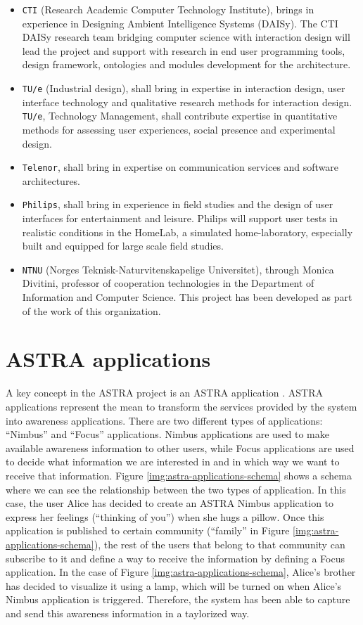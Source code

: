 \begin{itemize}
  \item \verb|CTI| (Research Academic Computer Technology Institute), brings in
  experience in Designing Ambient Intelligence Systems (DAISy). 
  The CTI DAISy research team bridging computer science with interaction design will 
  lead the project and support with research in end user programming tools, design framework, 
  ontologies and modules development for the architecture.
  \item \verb|TU/e| (Industrial design), shall bring in expertise in interaction
  design, user interface technology and qualitative research methods for interaction design. 
  \verb|TU/e|, Technology Management, shall contribute expertise in quantitative methods for assessing 
  user experiences, social presence and experimental design. 
  \item \verb|Telenor|, shall bring in expertise on communication services and
  software architectures.
  \item \verb|Philips|, shall bring in experience in field studies and the
  design of user interfaces for entertainment and leisure. Philips will support user tests in realistic 
  conditions in the HomeLab, a simulated home-laboratory, especially built and equipped for 
  large scale field studies. 
  \item \verb|NTNU| (Norges Teknisk-Naturvitenskapelige Universitet), through
  Monica Divitini, professor of cooperation technologies in the Department of
  Information and Computer Science. This project has been developed as part of
  the work of this organization.
\end{itemize}

\section{ASTRA applications}
\label{subsec:intro-awareness-applications}
A key concept in the ASTRA project is an ASTRA application
\cite{astra-repo}. ASTRA applications represent the mean to transform the
services provided by the system into awareness applications. 
There are two different types of applications: ``Nimbus'' and ``Focus''
applications. Nimbus applications are used to make available 
awareness information to other users, while Focus applications are used to
decide what information we are interested in and in which way we want to 
receive that information.
Figure \ref{img:astra-applications-schema} shows a schema where we can see  the
relationship between the two types of application. In this case, the user 
Alice has decided to create an ASTRA Nimbus application to express her feelings 
(``thinking of you'') when she hugs a pillow. Once this application is
published  to certain community (``family'' in Figure 
\ref{img:astra-applications-schema}), the rest of the users that belong to  that
community can subscribe to it and define a way to receive the information by 
defining a Focus application. In the case of Figure 
\ref{img:astra-applications-schema}, Alice's brother has decided to visualize 
it using a lamp, which will be turned on when Alice's Nimbus application is
triggered. Therefore, the system has been able to capture and send
this awareness information in a taylorized way.

